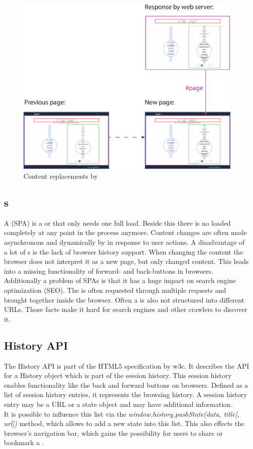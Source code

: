 \begin{figure}[H]
\centering
\includegraphics[width=12cm]{images/ajax_replacements.pdf}
\caption[ajax_replacements]{Content replacements by \ajax{}}
\label{fig:ajax_replacements}
\end{figure}

\subsection{\SinglePageApplication{}s\label{singlePageApplication}}
A \singlePageApplication{} (SPA) is a \webApplication{} or \webSite{} that only needs one full \webPage{} load.
Beside this there is no \webPage{} loaded completely at any point in the process anymore.
Content changes are often made asynchronous and dynamically by \ajax{} in response to user actions.
A disadvantage of a lot of \singlePageApplication{}s is the lack of browser history support.
When changing the content the browser does not interpret it as a new page, but only changed content.
This leads into a missing functionality of forward- and back-buttons in browsers.
\\
Additionally a problem of SPAs is that it has a huge impact on search engine optimization (SEO).
The \webPage{} is often requested through multiple requests and brought together inside the browser. Often a \webSite{} is also not structured into different URLs.
Those facts make it hard for search engines and other crawlers to discover it.

\subsection{History API}
The History API is part of the HTML5 specification by \gls{w3c}.
It describes the API for a History object which is part of the session history.
This session history enables functionality like the back and forward buttons on browsers.
Defined as a list of session history entries, it represents the browsing history.
A session history entry may be a URL or a state object and may have additional information.
\\
It is possible to influence this list via the \emph{window.history.pushState(data, title[, url])} method, which allows to add a new state into this list.
This also effects the browser's navigation bar, which gains the possibility for users to share or bookmark a \webPage{}.
\\
